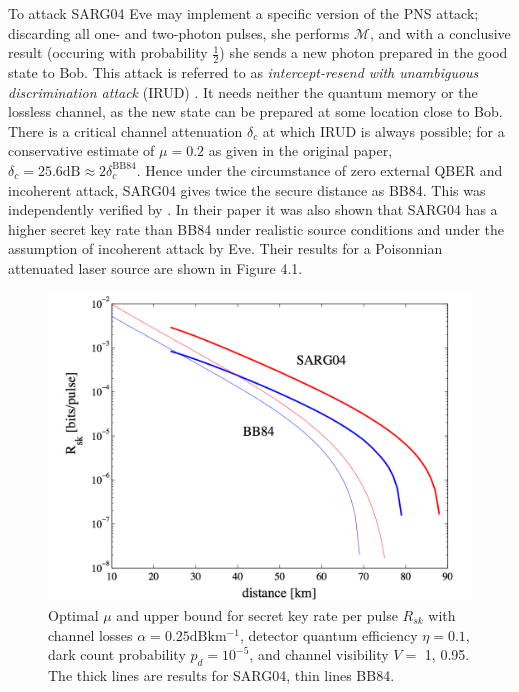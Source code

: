 \documentclass[paper=a4, fontsize=11pt]{scrartcl} %
\numberwithin{equation}{section} %
\numberwithin{figure}{section} %
\numberwithin{table}{section} %
\begin{document}
To attack SARG04 Eve may implement a specific version of the PNS attack; discarding all one- and two-photon pulses,
she performs $\mathcal{M}$, and with a conclusive result (occuring with probability $\frac{1}{2}$) she sends a new photon prepared in the good state to Bob.
This attack is referred to as \textit{intercept-resend with unambiguous discrimination attack} (IRUD) \citep{SARG04orig}. It needs neither the quantum memory or
the lossless channel, as the new state can be prepared at some location close to Bob. There is a critical channel attenuation $\delta_c$ at which IRUD is
always possible; for a conservative estimate of $\mu = 0.2$ as given in the original paper, $\delta_c = 25.6 \si{\dB} \approx 2\delta_c^{\mathrm{BB84}}$. Hence under
the circumstance of zero external QBER and incoherent attack, SARG04 gives twice the secure distance as BB84. This was independently verified by \citet{branciardSARG04}.
In their paper it was also shown that SARG04 has a higher secret key rate than BB84 under realistic source conditions and under the assumption of incoherent attack by Eve.
Their results for a Poisonnian attenuated laser source are shown in Figure 4.1.

\begin{figure}
	\includegraphics[width=\linewidth]{branciard-graph.png}
	\caption{Optimal $\mu$ and upper bound for secret key rate per pulse $R_{sk}$ with
	channel losses $\alpha=0.25\si{\dB \km^{-1}}$, detector quantum efficiency $\eta = 0.1$, dark count
	probability $p_d = 10^{-5}$, and channel visibility $V=$ 1, 0.95. The thick lines
	are results for SARG04, thin lines BB84. \citep{branciardSARG04}}
\end{figure}
\end{document}
